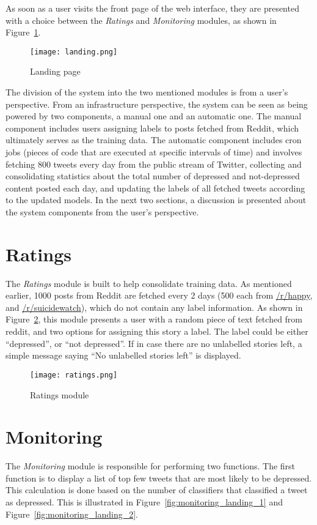As soon as a user visits the front page of the web interface, they are presented with a choice between the \emph{Ratings} and \emph{Monitoring} modules, as shown in Figure~\ref{fig:landing}.

\begin{figure}
    \centering
    \texttt{[image: landing.png]}
    \caption{Landing page}
    \label{fig:landing}
\end{figure}

The division of the system into the two mentioned modules is from a user's perspective. From an infrastructure perspective, the system can be seen as being powered by two components, a manual one and an automatic one. The manual component includes users assigning labels to posts fetched from Reddit, which ultimately serves as the training data. The automatic component includes cron jobs (pieces of code that are executed at specific intervals of time) and involves fetching 800 tweets every day from the public stream of Twitter, collecting and consolidating statistics about the total number of depressed and not-depressed content posted each day, and updating the labels of all fetched tweets according to the updated models. In the next two sections, a discussion is presented about the system components from the user's perspective.

\section{Ratings}
The \emph{Ratings} module is built to help consolidate training data. As mentioned earlier, 1000 posts from Reddit are fetched every 2 days (500 each from \href{http://www.reddit.com/r/happy}{/r/happy}, and \href{http://www.reddit.com/r/suicidewatch}{/r/suicidewatch}), which do not contain any label information. As shown in Figure~\ref{fig:ratings}, this module presents a user with a random piece of text fetched from reddit, and two options for assigning this story a label. The label could be either ``depressed'', or ``not depressed''. If in case there are no unlabelled stories left, a simple message saying ``No unlabelled stories left'' is displayed.

\begin{figure}
    \centering
    \texttt{[image: ratings.png]}
    \caption{Ratings module}
    \label{fig:ratings}
\end{figure}

\section{Monitoring}
The \emph{Monitoring} module is responsible for performing two functions. The first function is to display a list of top few tweets that are most likely to be depressed. This calculation is done based on the number of classifiers that classified a tweet as depressed. This is illustrated in Figure~\ref{fig:monitoring_landing_1} and Figure~\ref{fig:monitoring_landing_2}.

